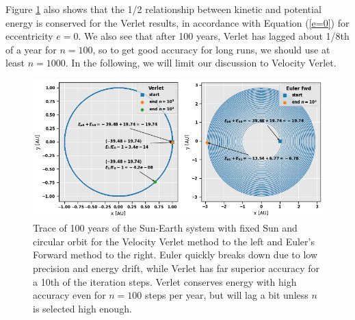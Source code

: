 \documentclass[]{article}
\begin{document}
Figure \ref{fig:verlet-euler} also shows that the 1/2 relationship between kinetic and potential energy is conserved for the Verlet results, in accordance with Equation (\ref{e=0}) for eccentricity $e=0$. We also see that after 100 years, Verlet has lagged about 1/8th of a year for $n=100$, so to get good accuracy for long runs, we should use at least $n=1000$. In the following, we will limit our discussion to Velocity Verlet.

\begin{figure}[!htb]
	\centering
	\includegraphics[width=1\linewidth]{verlet-euler.png}
	\caption{Trace of 100 years of the Sun-Earth system with fixed Sun and circular orbit for the Velocity Verlet method to the left and Euler's Forward method to the right. Euler quickly breaks down due to low precision and energy drift, while Verlet has far superior accuracy for a 10th of the iteration steps. Verlet conserves energy with high accuracy even for $n=100$ steps per year, but will lag a bit unless $n$ is selected high enough.}
	\label{fig:verlet-euler}
\end{figure}
\end{document}
